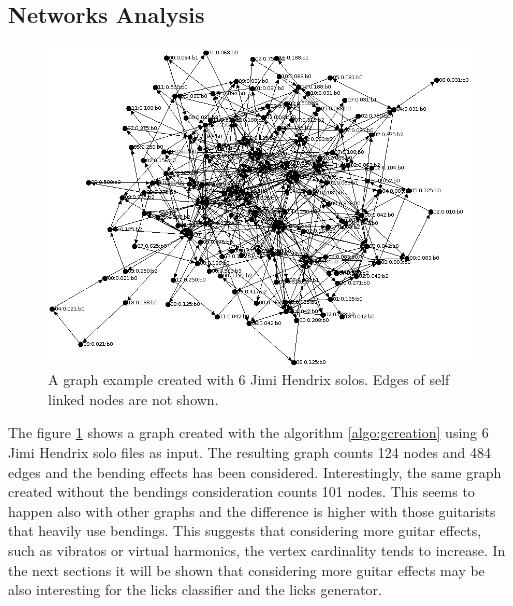 \documentclass{llncs}
\begin{document}
\subsection{Networks Analysis}
\begin{figure}
\centering
\includegraphics[scale=0.32]{hendrix_graph.png}
\caption{A graph example created with 6 Jimi Hendrix
solos. Edges of self linked nodes are not shown.}
\label{fig:hendrixgraph}
\end{figure}
The figure \ref{fig:hendrixgraph} shows a graph created with the
algorithm \ref{algo:gcreation} using 6 Jimi Hendrix solo files as input.
The resulting graph counts 124 nodes and 484 edges and the bending
effects has been considered. Interestingly, the same graph created
without the bendings consideration counts 101 nodes. This seems to
happen also with other graphs and the difference is higher with those
guitarists that heavily use bendings. This suggests that 
considering more 
guitar effects, such as vibratos or virtual harmonics, 
the vertex cardinality tends to increase. In the next
sections it will be shown that considering more guitar effects may be 
also interesting for the
licks classifier and the licks generator.
\end{document}
